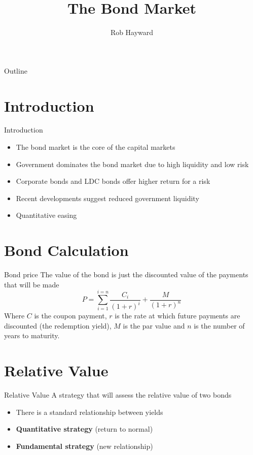 \documentclass[14pt,xcolor=pdftex,dvipsnames,table]{beamer}\usepackage[]{graphicx}\usepackage[]{color}
\title{The Bond Market}
\author{Rob Hayward}
\begin{document}
\begin{frame}
\titlepage
\end{frame}


\begin{frame}{Outline}
\tableofcontents
\end{frame}


\section{Introduction}
\begin{frame}{Introduction}
\begin{itemize}
\item The bond market is the core of the capital markets
\item Government dominates the bond market due to high liquidity and low risk
\item Corporate bonds and LDC bonds offer higher return for a risk
\item Recent developments suggest reduced government liquidity
\item Quantitative easing 
\end{itemize}
\end{frame}



\section{Bond Calculation}
\begin{frame}{Bond price}
The value of the bond is just the discounted value of the payments that will be made
\begin{equation*}
P = \sum_{i = 1}^{i = n} \frac{C_i}{(1+r)^i} + \frac{M}{(1+r)^n}
\end{equation*}
Where $C$ is the coupon payment, $r$ is the rate at which future payments are discounted (the redemption yield), $M$ is the par value and $n$ is the number of years to maturity. 
\end{frame}

\section{Relative Value}
\begin{frame}{Relative Value}
A strategy that will assess the relative value of two bonds
\begin{itemize}
\item There is a standard relationship between yields
\item \textbf{Quantitative strategy} (return to normal)
\item \textbf{Fundamental strategy} (new relationship)
\end{itemize}
\end{frame}
\end{document}
